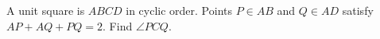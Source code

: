 A unit square is $ABCD$ in cyclic order. Points $P\in AB$ and $Q\in AD$ satisfy $AP+AQ+PQ=2$. Find $\angle PCQ$.
